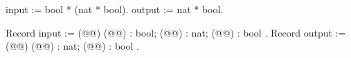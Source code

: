 input :=
  bool * (nat * bool).
output :=
  nat * bool.

Record input :=
  (@@) { (@@) : bool; (@@) : nat; (@@) : bool }.
Record output :=
  (@@) { (@@) : nat; (@@) : bool }.

